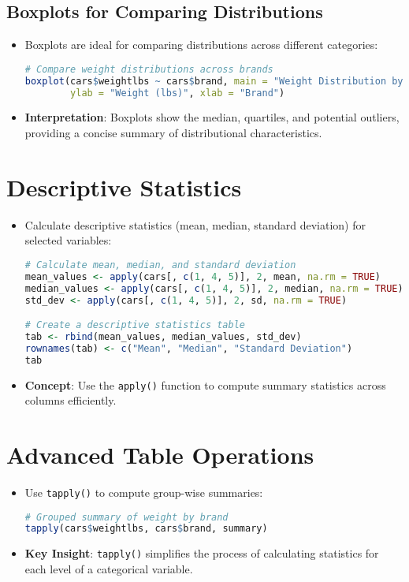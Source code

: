 \documentclass{article}
\begin{document}
\subsection{Boxplots for Comparing Distributions}
\begin{itemize}
    \item Boxplots are ideal for comparing distributions across different categories:
\begin{lstlisting}[language=R]
# Compare weight distributions across brands
boxplot(cars$weightlbs ~ cars$brand, main = "Weight Distribution by Brand",
        ylab = "Weight (lbs)", xlab = "Brand")
\end{lstlisting}
    \item \textbf{Interpretation}: Boxplots show the median, quartiles, and potential outliers, providing a concise summary of distributional characteristics.
\end{itemize}

\section{Descriptive Statistics}
\begin{itemize}
    \item Calculate descriptive statistics (mean, median, standard deviation) for selected variables:
\begin{lstlisting}[language=R]
# Calculate mean, median, and standard deviation
mean_values <- apply(cars[, c(1, 4, 5)], 2, mean, na.rm = TRUE)
median_values <- apply(cars[, c(1, 4, 5)], 2, median, na.rm = TRUE)
std_dev <- apply(cars[, c(1, 4, 5)], 2, sd, na.rm = TRUE)

# Create a descriptive statistics table
tab <- rbind(mean_values, median_values, std_dev)
rownames(tab) <- c("Mean", "Median", "Standard Deviation")
tab
\end{lstlisting}
    \item \textbf{Concept}: Use the \texttt{apply()} function to compute summary statistics across columns efficiently.
\end{itemize}

\section{Advanced Table Operations}
\begin{itemize}
    \item Use \texttt{tapply()} to compute group-wise summaries:
\begin{lstlisting}[language=R]
# Grouped summary of weight by brand
tapply(cars$weightlbs, cars$brand, summary)
\end{lstlisting}
    \item \textbf{Key Insight}: \texttt{tapply()} simplifies the process of calculating statistics for each level of a categorical variable.
\end{itemize}
\end{document}
